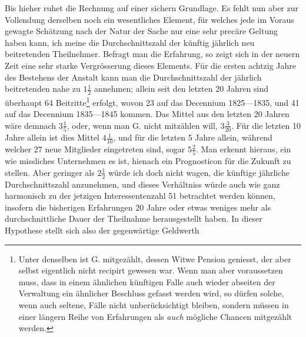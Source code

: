 Bis hieher ruhet die Rechnung auf einer sichern Grundlage. Es fehlt nun aber zur Vollendung derselben noch ein wesentliches Element, für welches jede im Voraus gewagte Schätzung nach der Natur der Sache nur eine sehr precäre Geltung haben kann, ich meine die Durchschnittszahl der künftig jährlich neu beitretenden Theilnehmer. Befragt man die Erfahrung, so zeigt sich in der neuern Zeit eine sehr starke Vergrösserung dieses Elements. Für die ersten achtzig Jahre des Bestehens der Anstalt kann man die Durchschnittszahl der jährlich beitretenden nahe zu \(1\tfrac{1}{2}\) annehmen; allein seit den letzten 20 Jahren sind überhaupt 64 Beitritte\footnote{Unter denselben ist G. mitgezählt, dessen Witwe Pension geniesst, der aber selbst eigentlich nicht recipirt gewesen war. Wenn man aber voraussetzen muss, dass in einem ähnlichen künftigen Falle auch wieder abseiten der Verwaltung ein ähnlicher Beschluss gefasst werden wird, so dürfen solche, wenn auch seltene, Fälle nicht unberücksichtigt bleiben, sondern müssen in einer längern Reihe von Erfahrungen als \textit{auch} mögliche Chancen mitgezählt werden.} erfolgt, wovon 23 auf das Decennium 1825—1835, und 41 auf das Decennium 1835—1845 kommen. Das Mittel aus den letzten 20 Jahren wäre demnach \(3\tfrac{1}{5}\), oder, wenn man G. nicht mitzählen will, \(3\tfrac{3}{20}\). Für die letzten 10 Jahre allein ist dies Mittel \(4\tfrac{1}{10}\), und für die letzten 5 Jahre allein, während welcher 27 neue Mitglieder eingetreten sind, sogar \(5\tfrac{2}{5}\). Man erkennt hieraus, ein wie missliches Unternehmen es ist, hienach ein Prognosticon für die Zukunft zu stellen. Aber geringer als \(2\tfrac{1}{2}\) würde ich doch nicht wagen, die künftige jährliche Durchschnittszahl anzunehmen, und dieses Verhältniss würde auch wie ganz harmonisch zu der jetzigen Interessentenzahl 51 betrachtet werden können, insofern die bisherigen Erfahrungen 20 Jahre oder etwas weniges mehr als durchschnittliche Dauer der Theilnahme herausgestellt haben. In dieser Hypothese stellt sich also der gegenwärtige Geldwerth
